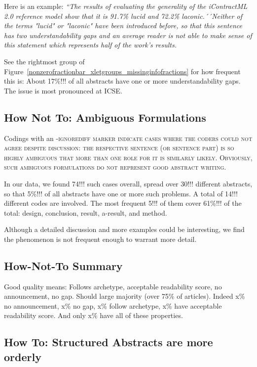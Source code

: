 \documentclass[10pt,journal,compsoc]{IEEEtran}
\newcommand{\Cb}[1]{\bgroup\scshape #1\egroup}  %
\newcommand{\Quote}[1]{\bgroup\itshape ``#1´´\egroup}
\begin{document}
Here is an example:
\Quote{The results of evaluating the generality of the iContractML 2.0 reference model show 
  that it is 91.7\% lucid and 72.2\% laconic.} [HamMetQas22]
Neither of the terms "lucid" or "laconic" have been introduced before, so that
this sentence has two understandability gaps and
an average reader is not able to make sense of this statement
which represents half of the work's results.

See the rightmost group of Figure~\ref{nonzerofractionbar_xletgroups_missinginfofractions} 
for how frequent this is:  
About 17\%!!! of all abstracts have one or more understandability gaps.
The issue is most pronounced at ICSE.


\subsection{How Not To: Ambiguous Formulations}

Codings with an \Cb{-ignorediff} marker indicate cases where the coders could not agree
despite discussion: the respective sentence (or sentence part) is so highly ambiguous that
more than one role for it is similarly likely.
Obviously, such ambiguous formulations do not represent good abstract writing.

In our data, we found 74!!! such cases overall, spread over 30!!! different abstracts,
so that 5\%!!! of all abstracts have one or more such problems.
A total of 14!!! different codes are involved.
The most frequent 5!!! of them cover 61\%!!! of the total:
design, conclusion, result, a-result, and method.

Although a detailed discussion and more examples could be interesting, 
we find the phenomenon is not frequent enough to warrant more detail.


\subsection{How-Not-To Summary}

Good quality means: Follows archetype, acceptable readability score, no announcement, no gap.
Should large majority (over 75\% of articles).
Indeed x\% no announcement, x\% no gap, x\% follow archetype, x\% have acceptable readability score.
And only x\% have all of these properties.


\subsection{How To: Structured Abstracts are more orderly}
\end{document}
